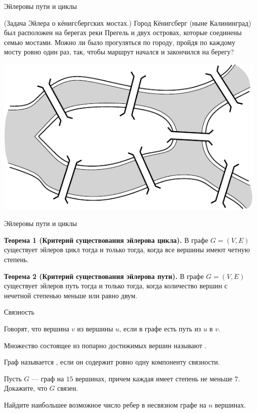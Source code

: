 \begin{frame}{Эйлеровы пути и циклы}

\exmpl (Задача Эйлера о кёнигсбергских мостах.) Город Кёнигсберг (ныне Калининград) был расположен на берегах реки Прегель и двух островах, которые соединены семью мостами. Можно ли было прогуляться по городу, пройдя по каждому мосту ровно один раз, так, чтобы маршрут начался и закончился на берегу?

\centerline{\includegraphics[scale=0.4]{img/euler2.png}}

\end{frame}

\begin{frame}{Эйлеровы пути и циклы}

{\bf Теорема 1 (Критерий существования эйлерова цикла).} В графе $G=(V,E)$ существует эйлеров цикл тогда и только тогда, когда все вершины имеют четную степень.

\spc
{\bf Теорема 2 (Критерий существования эйлерова пути).} В графе $G=(V,E)$ существует эйлеров путь тогда и только тогда, когда количество вершин с нечетной степенью меньше или равно двум.

\end{frame}

\begin{frame}{Связность}

 Говорят, что вершина $v$  из вершины $u$, если в графе есть
путь из $u$ в $v$. 

 Множество состоящее из попарно достижимых вершин называют .

 Граф называется , если он содержит ровно одну компоненту связности.

\exmpl Пусть $G$ --- граф на $15$ вершинах, причем каждая имеет степень не меньше $7$. Докажите, что $G$ связен.

\exmpl Найдите наибольшее возможное число ребер в несвязном графе на $n$ вершинах.

\end{frame}

